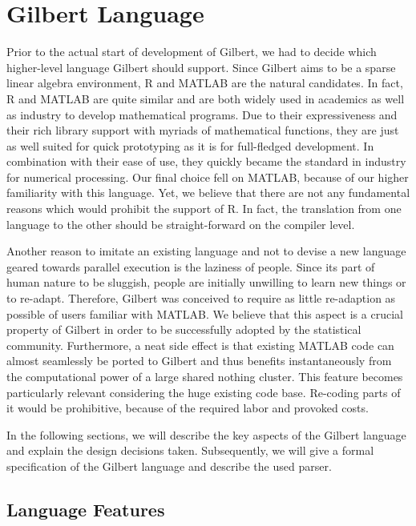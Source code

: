 \chapter{Gilbert Language}
\label{cha:gilbertlanguage}


Prior to the actual start of development of Gilbert, we had to decide which higher-level language Gilbert should support.
Since Gilbert aims to be a sparse linear algebra environment, R and MATLAB are the natural candidates.
In fact, R and MATLAB are quite similar and are both widely used in academics as well as industry to develop mathematical programs.
Due to their expressiveness and their rich library support with myriads of mathematical functions, they are just as well suited for quick prototyping as it is for full-fledged development.
In combination with their ease of use, they quickly became the standard in industry for numerical processing.
Our final choice fell on MATLAB, because of our higher familiarity with this language.
Yet, we believe that there are not any fundamental reasons which would prohibit the support of R.
In fact, the translation from one language to the other should be straight-forward on the compiler level.

Another reason to imitate an existing language and not to devise a new language geared towards parallel execution is the laziness of people.
Since its part of human nature to be sluggish, people are initially unwilling to learn new things or to re-adapt.
Therefore, Gilbert was conceived to require as little re-adaption as possible of users familiar with MATLAB.
We believe that this aspect is a crucial property of Gilbert in order to be successfully adopted by the statistical community.
Furthermore, a neat side effect is that existing MATLAB code can almost seamlessly be ported to Gilbert and thus benefits instantaneously from the computational power of a large shared nothing cluster.
This feature becomes particularly relevant considering the huge existing code base.
Re-coding parts of it would be prohibitive, because of the required labor and provoked costs.

In the following sections, we will describe the key aspects of the Gilbert language and explain the design decisions taken.
Subsequently, we will give a formal specification of the Gilbert language and describe the used parser.

\section{Language Features}
\label{sec:languageFeatures}

